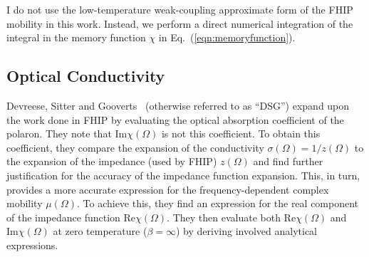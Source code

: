 I do not use the low-temperature weak-coupling approximate form of the FHIP mobility in this work. Instead, we perform a direct numerical integration of the integral in the memory function $\chi$ in Eq.~(\ref{eqn:memoryfunction}).

\subsection{Optical Conductivity}
\label{subsec:2-3-2}

Devreese, Sitter and Gooverts~\cite{devreese_optical_1972} (otherwise referred to as ``DSG'') expand upon the work done in FHIP by evaluating the optical absorption coefficient of the polaron. They note that $\text{Im}\chi(\Omega)$ is not this coefficient. To obtain this coefficient, they compare the expansion of the conductivity $\sigma(\Omega) = 1 / z(\Omega)$ to the expansion of the impedance (used by FHIP) $z(\Omega)$ and find further justification for the accuracy of the impedance function expansion. This, in turn, provides a more accurate expression for the frequency-dependent complex mobility $\mu(\Omega)$. To achieve this, they find an expression for the real component of the impedance function $\text{Re}\chi(\Omega)$. They then evaluate both $\text{Re}\chi(\Omega)$ and $\text{Im}\chi(\Omega)$ at zero temperature ($\beta = \infty$) by deriving involved analytical expressions. 

